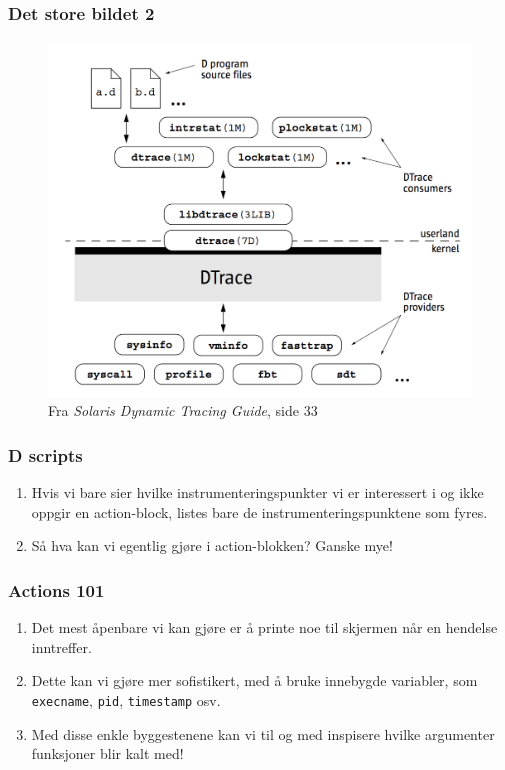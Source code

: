 \documentclass{beamer}
\begin{document}
 \begin{frame}
     \frametitle{Det store bildet 2}
\begin{figure}
\includegraphics[scale=0.40]{architecture.png}
\caption{Fra \emph{Solaris Dynamic Tracing Guide}, side 33}
\end{figure}
 \end{frame}

 \begin{frame}
     \frametitle{D scripts}
\begin{enumerate}

    \item Hvis vi bare sier hvilke instrumenteringspunkter vi er interessert i
      og ikke oppgir en action-block, listes bare de instrumenteringspunktene
      som fyres.

  \item Så hva kan vi egentlig gjøre i action-blokken? Ganske mye!

\end{enumerate}
 \end{frame}

 \begin{frame}
     \frametitle{Actions 101}
\begin{enumerate}

\item Det mest åpenbare vi kan gjøre er å printe noe til skjermen
    når en hendelse inntreffer.

\item Dette kan vi gjøre mer sofistikert, med å bruke innebygde
    variabler, som \texttt{execname}, \texttt{pid}, \texttt{timestamp} osv.

\item Med disse enkle byggestenene kan vi til og med inspisere hvilke
    argumenter funksjoner blir kalt med!

\end{enumerate}
 \end{frame}
\end{document}
